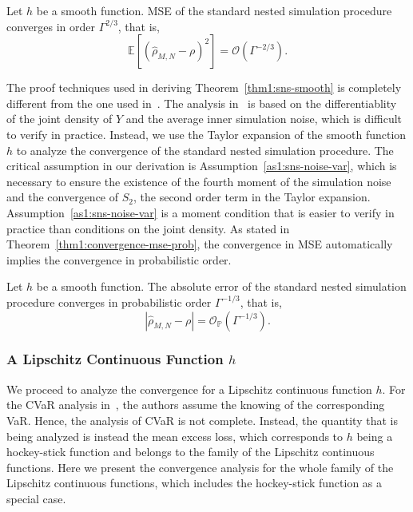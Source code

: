 \begin{theorem} \label{thm1:sns-smooth}
    Let $h$ be a smooth function. 
    MSE of the standard nested simulation procedure converges in order $\Gamma^{2/3}$, that is,
    $$\mathbb{E} \left[ \left( \hat{\rho}_{M, N} - \rho \right)^2 \right] = \mathcal{O}(\Gamma^{-2/3}).$$
\end{theorem}
The proof techniques used in deriving Theorem~\ref{thm1:sns-smooth} is completely different from the one used in~\cite{gordy2010nested}.
The analysis in~\cite{gordy2010nested} is based on the differentiablity of the joint density of $Y$ and the average inner simulation noise, which is difficult to verify in practice.
Instead, we use the Taylor expansion of the smooth function $h$ to analyze the convergence of the standard nested simulation procedure.
The critical assumption in our derivation is Assumption~\ref{as1:sns-noise-var}, which is necessary to ensure the existence of the fourth moment of the simulation noise and the convergence of $S_2$, the second order term in the Taylor expansion.
Assumption~\ref{as1:sns-noise-var} is a moment condition that is easier to verify in practice than conditions on the joint density.
As stated in Theorem~\ref{thm1:convergence-mse-prob}, the convergence in MSE automatically implies the convergence in probabilistic order.

\begin{corollary}
    Let $h$ be a smooth function. 
    The absolute error of the standard nested simulation procedure converges in probabilistic order $\Gamma^{-1/3}$, that is,
    $$\left| \hat{\rho}_{M, N} - \rho \right| = \mathcal{O}_\mathbb{P}(\Gamma^{-1/3}).$$
\end{corollary}

\subsubsection*{A Lipschitz Continuous Function $h$}
We proceed to analyze the convergence for a Lipschitz continuous function $h$.
For the CVaR analysis in~\cite{gordy2010nested}, the authors assume the knowing of the corresponding VaR.
Hence, the analysis of CVaR is not complete.
Instead, the quantity that is being analyzed is instead the mean excess loss, which corresponds to $h$ being a hockey-stick function and belongs to the family of the Lipschitz continuous functions. 
Here we present the convergence analysis for the whole family of the Lipschitz continuous functions, which includes the hockey-stick function as a special case. 

